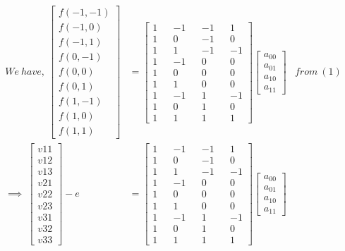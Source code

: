 \documentclass[a4paper,fleqn,11pt]{article}
\theoremstyle{mytheor}
\begin{document}
\begin{align}
We\ have,\ \begin{bmatrix}
				f(-1, -1) \\
				f(-1,  0) \\
				f(-1,  1) \\
				f( 0, -1) \\
				f( 0,  0) \\
				f( 0,  1) \\
				f( 1, -1) \\
				f( 1,  0) \\
				f( 1,  1)
			\end{bmatrix} & = 
			\begin{bmatrix}
				1 &&	-1 &&	-1 &&	 1 \\
				1 &&	 0 &&	-1 &&    0 \\
				1 && 	 1 &&	-1 &&	-1 \\
				1 &&	-1 &&	 0 &&	 0 \\
				1 &&	 0 &&	 0 &&	 0 \\
				1 &&	 1 &&	 0 &&	 0 \\
				1 &&	-1 &&	 1 &&	-1 \\
				1 &&	 0 &&	 1 &&	 0 \\
				1 &&	 1 &&	 1 &&	 1
			\end{bmatrix}
			\begin{bmatrix}
				a_{00} \\
				a_{01} \\
				a_{10} \\
				a_{11}	
			\end{bmatrix} & from\ (1)\\
\implies\ \begin{bmatrix}
				v{11} \\
				v{12} \\
				v{13} \\
				v{21} \\
				v{22} \\
				v{23} \\
				v{31} \\
				v{32} \\
				v{33}
			\end{bmatrix} - e & = 
			\begin{bmatrix}
				1 &&	-1 &&	-1 &&	 1 \\
				1 &&	 0 &&	-1 &&    0 \\
				1 && 	 1 &&	-1 &&	-1 \\
				1 &&	-1 &&	 0 &&	 0 \\
				1 &&	 0 &&	 0 &&	 0 \\
				1 &&	 1 &&	 0 &&	 0 \\
				1 &&	-1 &&	 1 &&	-1 \\
				1 &&	 0 &&	 1 &&	 0 \\
				1 &&	 1 &&	 1 &&	 1
			\end{bmatrix}
			\begin{bmatrix}
				a_{00} \\
				a_{01} \\
				a_{10} \\
				a_{11}	
			\end{bmatrix}
\end{align}
\end{document}
